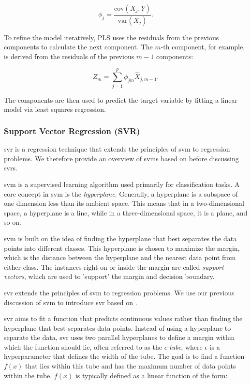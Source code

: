 $$
    \phi_j = \frac{\text{cov}(X_j, Y)}{\text{var}(X_j)}.
$$

To refine the model iteratively, PLS uses the residuals from the previous components to calculate the next component.
The $m$-th component, for example, is derived from the residuals of the previous $m-1$ components:

$$
    Z_m = \sum_{j=1}^{p} \phi_{jm} \hat{X}_{j, m-1}.
$$

The components are then used to predict the target variable by fitting a linear model via least squares regression.

\subsubsection{Support Vector Regression (SVR)}
\gls{svr} is a regression technique that extends the principles of \gls{svm} to regression problems.
We therefore provide an overview of \gls{svm}s based on \citet{James2023AnIS} before discussing \gls{svr}s.

\gls{svm} is a supervised learning algorithm used primarily for classification tasks.
A core concept in \gls{svm} is the \textit{hyperplane}.
Generally, a hyperplane is a subspace of one dimension less than its ambient space.
This means that in a two-dimensional space, a hyperplane is a line, while in a three-dimensional space, it is a plane, and so on.

\gls{svm} is built on the idea of finding the hyperplane that best separates the data points into different classes.
This hyperplane is chosen to maximize the margin, which is the distance between the hyperplane and the nearest data point from either class.
The instances right on or inside the margin are called \textit{support vectors}, which are used to 'support' the margin and decision boundary.

\gls{svr} extends the principles of \gls{svm} to regression problems.
We use our previous discussion of \gls{svm} to introduce \gls{svr} based on \citet{druckerSVR}.

\gls{svr} aims to fit a function that predicts continuous values rather than finding the hyperplane that best separates data points.
Instead of using a hyperplane to separate the data, \gls{svr} uses two parallel hyperplanes to define a margin within which the function should lie, often referred to as the $\epsilon$-\textit{tube}, where $\epsilon$ is a hyperparameter that defines the width of the tube.
The goal is to find a function $f(x)$ that lies within this tube and has the maximum number of data points within the tube.
$f(x)$ is typically defined as a linear function of the form:

